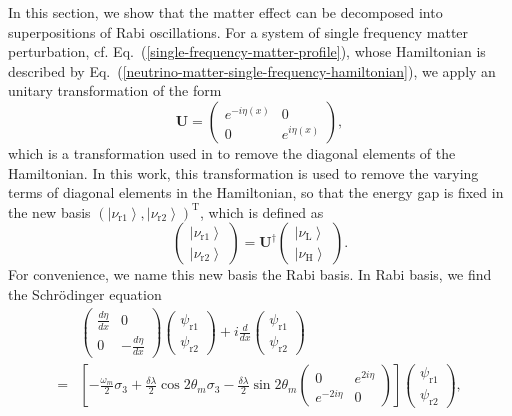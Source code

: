 \documentclass[%
reprint,
 amsmath,amssymb,
 aps,
]{revtex4-1}
\newcommand{\ket}[1]{\left| #1\right\rangle}
\begin{document}
In this section, we show that the matter effect can be decomposed into superpositions of Rabi oscillations. For a system of single frequency matter perturbation, cf. Eq.~(\ref{single-frequency-matter-profile}), whose Hamiltonian is described by Eq.~(\ref{neutrino-matter-single-frequency-hamiltonian}), we apply an unitary transformation of the form
\begin{equation}
    \mathbf{U} =  \begin{pmatrix} e^{-i \eta (x)} & 0 \\  0 & e^{i \eta (x)}  \end{pmatrix},
\end{equation}
which is a transformation used in \cite{Kneller2006} to remove the diagonal elements of the Hamiltonian. In this work, this transformation is used to remove the varying terms of diagonal elements in the Hamiltonian, so that the energy gap is fixed in the new basis $\left(\ket{\nu_{\mathrm{r1}}},\ket{\nu_{\mathrm{r2}}}\right)^{\mathrm{T}}$, which is defined as
\begin{equation}
    \begin{pmatrix} \ket{\nu_{\mathrm{r1}}}\\ \ket{\nu_{\mathrm{r2}}} \end{pmatrix} =  \mathbf{U}^\dagger \begin{pmatrix} \ket{\nu_{\mathrm{L}}} \\ \ket{\nu_{\mathrm{H}}} \end{pmatrix}.
\end{equation}
For convenience, we name this new basis the Rabi basis. In Rabi basis, we find the Schr\"{o}dinger equation
\begin{align*}
    &\begin{pmatrix}  \frac{d\eta}{dx}  & 0 \\ 0 & - \frac{d\eta}{dx}  \end{pmatrix} \begin{pmatrix} \psi_{\mathrm r1} \\ \psi_{\mathrm r2} \end{pmatrix} + i \frac{d}{dx} \begin{pmatrix} \psi_{\mathrm r1} \\ \psi_{\mathrm r2} \end{pmatrix} \\
    =&
\left[ -\frac{\omega_m}{2} \sigma_3  + \frac{\delta \lambda}{2} \cos 2\theta_m  \sigma_3  - \frac{\delta \lambda}{2} \sin 2\theta_m \begin{pmatrix} 0 & e^{2i\eta} \\ e^{-2 i\eta } & 0 \end{pmatrix}   \right] \begin{pmatrix} \psi_{\mathrm r1} \\ \psi_{\mathrm r2} \end{pmatrix},
\end{align*}
\end{document}
